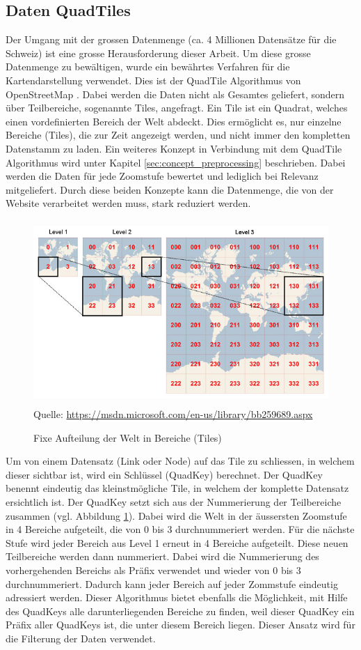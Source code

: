 \subsection{Daten QuadTiles}
\label{ch:datentiles}
Der Umgang mit der grossen Datenmenge (ca. 4 Millionen Datensätze für die Schweiz) ist eine grosse Herausforderung dieser Arbeit. Um diese grosse Datenmenge zu bewältigen, wurde ein bewährtes Verfahren für die Kartendarstellung verwendet. Dies ist der QuadTile Algorithmus von OpenStreetMap \citep{OSMQuadTiles}. Dabei werden die Daten nicht als Gesamtes geliefert, sondern über Teilbereiche, sogenannte Tiles, angefragt. Ein Tile ist ein Quadrat, welches einen vordefinierten Bereich der Welt abdeckt. Dies ermöglicht es, nur einzelne Bereiche (Tiles), die zur Zeit angezeigt werden, und nicht immer den kompletten Datenstamm zu laden. Ein weiteres Konzept in Verbindung mit dem QuadTile Algorithmus wird unter Kapitel \ref{sec:concept_preprocessing}  beschrieben. Dabei werden die Daten für jede Zoomstufe bewertet und lediglich bei Relevanz mitgeliefert. Durch diese beiden Konzepte kann die Datenmenge, die von der Website verarbeitet werden muss, stark reduziert werden.
\begin{figure}[H]
\centering
\includegraphics[height=7cm]{images/BingMapsTileSystem.jpg}
\\Quelle: \href{https://msdn.microsoft.com/en-us/library/bb259689.aspx}{https://msdn.microsoft.com/en-us/library/bb259689.aspx}
\caption{Fixe Aufteilung der Welt in Bereiche (Tiles)}
\label{fig:tilesystem}
\end{figure}
\noindent
Um von einem Datensatz (Link oder Node) auf das Tile zu schliessen, in welchem dieser sichtbar ist, wird ein Schlüssel (QuadKey) berechnet. Der QuadKey benennt eindeutig das kleinstmögliche Tile, in welchem der komplette Datensatz ersichtlich ist. Der QuadKey setzt sich aus der Nummerierung der Teilbereiche zusammen (vgl. Abbildung \ref{fig:tilesystem}). Dabei wird die Welt in der äussersten Zoomstufe in 4 Bereiche aufgeteilt, die von 0 bis 3 durchnummeriert werden. Für die nächste Stufe wird jeder Bereich aus Level 1 erneut in 4 Bereiche aufgeteilt. Diese neuen Teilbereiche werden dann nummeriert. Dabei wird die Nummerierung des vorhergehenden Bereichs als Präfix verwendet und wieder von 0 bis 3 durchnummeriert. Dadurch kann jeder Bereich auf jeder Zommstufe eindeutig adressiert werden. Dieser Algorithmus bietet ebenfalls die Möglichkeit, mit Hilfe des QuadKeys alle darunterliegenden Bereiche zu finden, weil dieser QuadKey ein Präfix aller QuadKeys ist, die unter diesem Bereich liegen. Dieser Ansatz wird für die Filterung der Daten verwendet.
